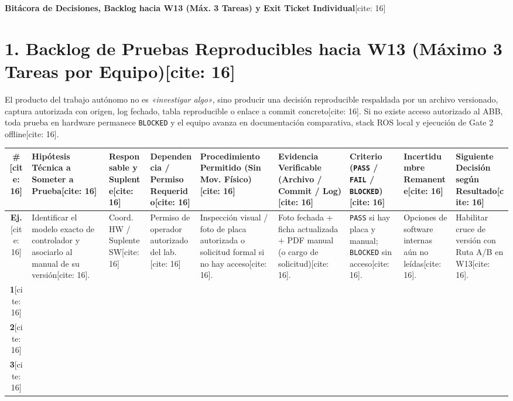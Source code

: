 \documentclass[10pt, a4paper, landscape]{article}
\begin{document}
\begin{center}
    \Large\textbf{\textcolor{ucbblue}{Bitácora de Decisiones, Backlog hacia W13 (Máx. 3 Tareas) y Exit Ticket Individual}}[cite: 16]
\end{center}

\section*{1. Backlog de Pruebas Reproducibles hacia W13 (Máximo 3 Tareas por Equipo)[cite: 16]}
El producto del trabajo autónomo no es \textit{«investigar algo»}, sino producir una decisión reproducible respaldada por un archivo versionado, captura autorizada con origen, log fechado, tabla reproducible o enlace a commit concreto[cite: 16]. Si no existe acceso autorizado al ABB, toda prueba en hardware permanece \texttt{BLOCKED} y el equipo avanza en documentación comparativa, stack ROS local y ejecución de Gate 2 offline[cite: 16].

\begin{center}
\scriptsize
\setlength{\tabcolsep}{3.5pt}
\renewcommand{\arraystretch}{1.55}
\begin{tabularx}{\textwidth}{|c|>{\hsize=1.05\hsize\raggedright\arraybackslash}X|>{\hsize=0.80\hsize\raggedright\arraybackslash}X|>{\hsize=0.90\hsize\raggedright\arraybackslash}X|>{\hsize=1.15\hsize\raggedright\arraybackslash}X|>{\hsize=1.05\hsize\raggedright\arraybackslash}X|>{\hsize=0.85\hsize\centering\arraybackslash}X|>{\hsize=1.00\hsize\raggedright\arraybackslash}X|>{\hsize=1.20\hsize\raggedright\arraybackslash}X|}
\hline
\rowcolor{ucbblue!15}
\textbf{\#}[cite: 16] & \textbf{Hipótesis Técnica a Someter a Prueba}[cite: 16] & \textbf{Responsable y Suplente}[cite: 16] & \textbf{Dependencia / Permiso Requerido}[cite: 16] & \textbf{Procedimiento Permitido (Sin Mov. Físico)}[cite: 16] & \textbf{Evidencia Verificable (Archivo / Commit / Log)}[cite: 16] & \textbf{Criterio} (\texttt{PASS} / \texttt{FAIL} / \texttt{BLOCKED})[cite: 16] & \textbf{Incertidumbre Remanente}[cite: 16] & \textbf{Siguiente Decisión según Resultado}[cite: 16] \\ \hline
\rowcolor{gray!10}
\textbf{Ej.}[cite: 16] & Identificar el modelo exacto de controlador y asociarlo al manual de su versión[cite: 16]. & Coord. HW / Suplente SW[cite: 16] & Permiso de operador autorizado del lab.[cite: 16] & Inspección visual / foto de placa autorizada o solicitud formal si no hay acceso[cite: 16]. & Foto fechada + ficha actualizada + PDF manual (o cargo de solicitud)[cite: 16]. & \texttt{PASS} si hay placa y manual; \texttt{BLOCKED} sin acceso[cite: 16]. & Opciones de software internas aún no leídas[cite: 16]. & Habilitar cruce de versión con Ruta A/B en W13[cite: 16]. \\ \hline
\textbf{1}[cite: 16] & & & & & & & \\[0.6cm] \hline
\textbf{2}[cite: 16] & & & & & & & \\[0.6cm] \hline
\textbf{3}[cite: 16] & & & & & & & \\[0.6cm] \hline
\end{tabularx}
\end{center}
\end{document}

